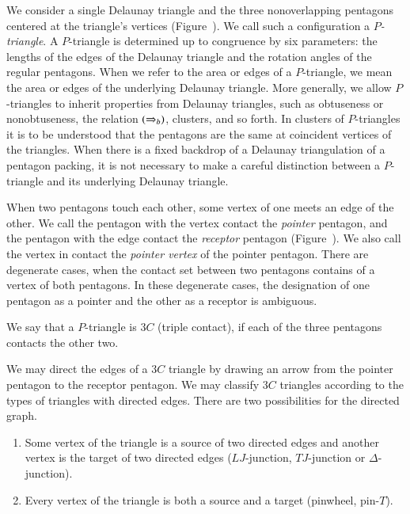 We consider a single Delaunay triangle and the three nonoverlapping
pentagons centered at the triangle's vertices
(Figure~).  We call such a configuration a {\it
  $P$-triangle}.  A $P$-triangle is determined up to congruence by six
parameters: the lengths of the edges of the Delaunay triangle and the
rotation angles of the regular pentagons.  When we refer to the area
or edges of a $P$-triangle, we mean the area or edges of the
underlying Delaunay triangle.  More generally, we allow $P$-triangles
to inherit properties from Delaunay triangles, such as obtuseness or
nonobtuseness, the relation $(\Rightarrow_{b})$, clusters, and so forth. In
clusters of $P$-triangles it is to be understood that the pentagons
are the same at coincident vertices of the triangles.  When there is a
fixed backdrop of a Delaunay triangulation of a pentagon packing, it
is not necessary to make a careful distinction between a $P$-triangle
and its underlying Delaunay triangle.


When two pentagons touch each other, some vertex of one meets an edge
of the other.  We call the pentagon with the vertex contact the {\it
  pointer} pentagon, and the pentagon with the edge contact the {\it
  receptor} pentagon (Figure~).  We also call the
vertex in contact the {\it pointer vertex} of the pointer
pentagon. There are degenerate cases, when the contact set between two
pentagons contains of a vertex of both pentagons.  In these degenerate
cases, the designation of one pentagon as a pointer and the other as a
receptor is ambiguous.




We say that a $P$-triangle is $3C$ (triple contact),
if each of the three pentagons contacts the other two.

We may direct the edges of a $3C$ triangle by drawing an arrow from
the pointer pentagon to the receptor pentagon.  We may classify $3C$
triangles according to the types of triangles with directed edges.
There are two possibilities for the directed graph.
\begin{enumerate}
\item Some vertex of the triangle is a source of two directed edges and another vertex
is the target of two directed edges  ($LJ$-junction, $TJ$-junction or
  $\Delta$-junction).
\item Every vertex of the triangle is both a source and a target (pinwheel, pin-$T$).
\end{enumerate}

